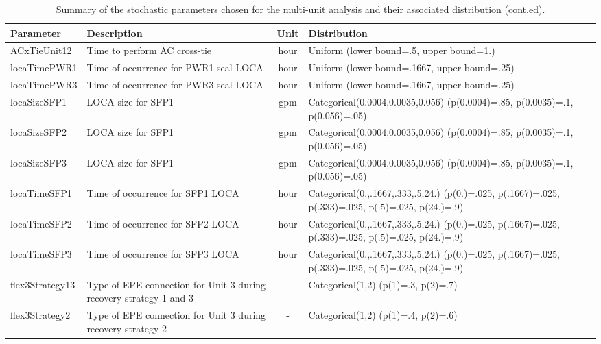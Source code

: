 \addtocounter{table}{-1}
\begin{table}
  \centering
  \begin{center}
      \begin{tabular}{ | l | p{5cm} | c | p{5cm} |}
        \hline
         \textbf{Parameter}          & \textbf{Description}                      & \textbf{Unit}   & \textbf{Distribution}                                         \\ \hline \hline
         ACxTieUnit12       & Time to perform AC cross-tie     & hour      & Uniform (lower bound=.5, upper bound=1.)             \\ \hline
         locaTimePWR1       & Time of occurrence for PWR1 seal LOCA & hour & Uniform (lower bound=.1667, upper bound=.25)         \\ \hline
         locaTimePWR3       & Time of occurrence for PWR3 seal LOCA & hour & Uniform (lower bound=.1667, upper bound=.25)         \\ \hline
         locaSizeSFP1       & LOCA size for SFP1               & gpm       & Categorical(0.0004,0.0035,0.056) (p(0.0004)=.85, p(0.0035)=.1, p(0.056)=.05)   \\ \hline
         locaSizeSFP2       & LOCA size for SFP1               & gpm       & Categorical(0.0004,0.0035,0.056) (p(0.0004)=.85, p(0.0035)=.1, p(0.056)=.05)   \\ \hline
         locaSizeSFP3       & LOCA size for SFP1               & gpm       & Categorical(0.0004,0.0035,0.056) (p(0.0004)=.85, p(0.0035)=.1, p(0.056)=.05)   \\ \hline    
         locaTimeSFP1       & Time of occurrence for SFP1 LOCA & hour      & Categorical(0.,.1667,.333,.5,24.) (p(0.)=.025, p(.1667)=.025, p(.333)=.025, p(.5)=.025, p(24.)=.9)  \\ \hline
         locaTimeSFP2       & Time of occurrence for SFP2 LOCA & hour      & Categorical(0.,.1667,.333,.5,24.) (p(0.)=.025, p(.1667)=.025, p(.333)=.025, p(.5)=.025, p(24.)=.9)  \\ \hline
         locaTimeSFP3       & Time of occurrence for SFP3 LOCA & hour      & Categorical(0.,.1667,.333,.5,24.) (p(0.)=.025, p(.1667)=.025, p(.333)=.025, p(.5)=.025, p(24.)=.9)  \\ \hline
         flex3Strategy13    & Type of EPE connection for Unit 3 during recovery strategy 1 and 3  & -      & Categorical(1,2) (p(1)=.3, p(2)=.7)             \\ \hline
         flex3Strategy2     & Type of EPE connection for Unit 3 during recovery strategy 2        & -      & Categorical(1,2) (p(1)=.4, p(2)=.6)             \\ 
        \hline
      \end{tabular}
  \end{center}
  \caption{Summary of the stochastic parameters chosen for the multi-unit analysis and their associated distribution (cont.ed).}
  \label{tab:stochasticParameters2}
\end{table}



